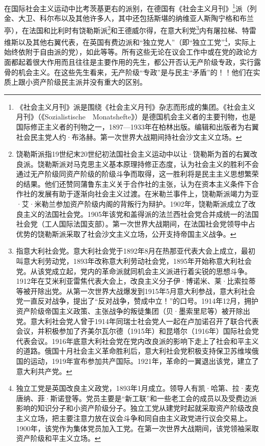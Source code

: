 \documentclass[UTF8, 12pt, a4paper]{ctexrep}
\begin{document}
在国际社会主义运动中比考茨基更右的派别，在德国有《社会主义月刊》\footnote{《社会主义月刊》派是围绕《社会主义月刊》杂志而形成的集团。《社会主义月刊》（《Sozialistische　Monatshefte》）是德国机会主义者的主要刊物，也是国际修正主义者的刊物之一，1897—1933年在柏林出版。编辑和出版者为右翼社会民主党人约·布洛赫。第一次世界大战期间持社会沙文主义立场。}派（列金、大卫、科尔布以及其他许多人，其中还包括斯堪的纳维亚人斯陶宁格和布兰亭），在法国和比利时有饶勒斯派\footnote{饶勒斯派指19世纪末20世纪初法国社会主义运动中以让·饶勒斯为首的右翼改良派。饶勒斯派对马克思主义基本原理持修正态度，认为社会主义的胜利不会通过无产阶级同资产阶级的阶级斗争而取得，这一胜利将是民主主义思想繁荣的结果。他们还赞同蒲鲁东主义关于合作社的主张，认为在资本主义条件下合作社的发展有助于逐渐向社会主义过渡。在米勒兰事件上，饶勒斯派竭力为亚·艾·米勒兰参加资产阶级内阁的背叛行为辩护。1902年，饶勒斯派成立了改良主义的法国社会党。1905年该党和盖得派的法兰西社会党合并成统一的法国社会党（工人国际法国支部）。第一次世界大战期间，在法国社会党领导中占优势的饶勒斯派采取了社会沙文主义立场，公开支持帝国主义战争。}和王德威尔得，在意大利党\footnote{指意大利社会党。意大利社会党于1892年8月在热那亚代表大会上成立，最初叫意大利劳动党，1893年改称意大利劳动社会党，1895年开始称意大利社会党。从该党成立起，党内的革命派就同机会主义派进行着尖锐的思想斗争。1912年在艾米利亚雷焦代表大会上，改良主义分子伊·博诺米、莱·比索拉蒂等被开除出党。从第一次世界大战爆发到1915年5月意大利参战，意大利社会党一直反对战争，提出了“反对战争，赞成中立！”的口号。1914年12月，拥护资产阶级帝国主义政策、主张战争的叛徒集团（贝·墨索里尼等）被开除出党。意大利社会党人曾于1914年同瑞士社会党人一起在卢加诺召开了联合代表会议，并积极参加了齐美尔瓦尔德（1915年）和昆塔尔（1916年）国际社会党代表会议。1916年底意大利社会党在党内改良派的影响下走上了社会和平主义的道路。俄国十月社会主义革命胜利后，意大利社会党积极支持保卫苏维埃俄国的运动，1919年宣布参加共产国际。1921年，革命的一翼退出该党，建立了意大利共产党。}内有屠拉梯、特雷维斯以及其他右翼代表，在英国有费边派和“独立党人”（即“独立工党”\footnote{独立工党是英国改良主义政党，1893年1月成立。领导人有凯·哈第、拉·麦克唐纳、菲·斯诺登等。党员主要是“新工联”和一些老工会的成员以及受费边派影响的知识分子和小资产阶级分子。独立工党从建党时起就采取资产阶级改良主义立场，把主要注意力放在议会斗争和同自由主义政党进行议会交易上。1900年，该党作为集体党员加入工党。在第一次世界大战期间，该党领袖采取资产阶级和平主义立场。}，实际上始终依附于自由派的党），如此等等。所有这些无论在议会工作中或在党的政论方面都起着很大作用而且往往是主要作用的先生，都公开否认无产阶级专政，实行露骨的机会主义。在这些先生看来，无产阶级“专政”是与民主“矛盾”的！！他们在实质上跟小资产阶级民主派并没有重大的区别。
\end{document}
